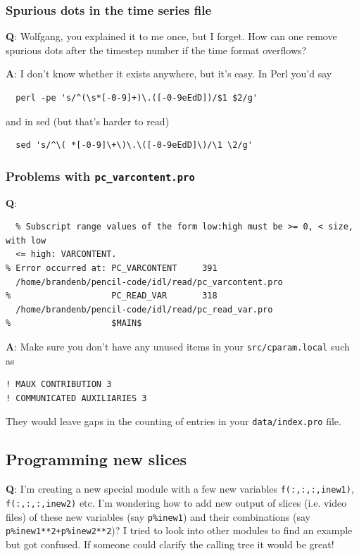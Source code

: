 \documentclass[\mydriver,12pt,twoside,notitlepage,a4paper]{article}
\newcommand{\code}[1]{\texttt{#1}}
\begin{document}
\subsubsection{Spurious dots in the time series file}

{\bf Q}:
Wolfgang, you explained it to me once, but I forget.
How can one remove spurious dots after the timestep number
if the time format overflows?

\medskip

{\bf A}:
I don't know whether it exists anywhere, but it's easy.
In Perl you'd say
\begin{Verbatim}
  perl -pe 's/^(\s*[-0-9]+)\.([-0-9eEdD])/$1 $2/g'
\end{Verbatim}
and in sed (but that's harder to read)
\begin{Verbatim}
  sed 's/^\( *[-0-9]\+\)\.\([-0-9eEdD]\)/\1 \2/g'
\end{Verbatim}


\subsubsection{Problems with \code{pc_varcontent.pro}}

{\bf Q}:

\begin{Verbatim}
  % Subscript range values of the form low:high must be >= 0, < size, with low
  <= high: VARCONTENT.
% Error occurred at: PC_VARCONTENT     391
  /home/brandenb/pencil-code/idl/read/pc_varcontent.pro
%                    PC_READ_VAR       318
  /home/brandenb/pencil-code/idl/read/pc_read_var.pro
%                    $MAIN$          
\end{Verbatim}

\medskip

{\bf A}:
Make sure you don't have any unused items in your
\code{src/cparam.local} such as
\begin{Verbatim}
! MAUX CONTRIBUTION 3
! COMMUNICATED AUXILIARIES 3
\end{Verbatim}
They would leave gaps in the counting of entries in your
\code{data/index.pro} file.


\subsection{Programming new slices}

{\bf Q}:
I'm creating a new special module with a few new variables \code{f(:,:,:,inew1)}, \code{f(:,:,:,inew2)} etc.
I'm wondering how to add new output of slices (i.e. video files)
of these new variables (say \code{p\%inew1}) and their combinations (say
\code{p\%inew1**2+p\%inew2**2})? I tried to look into other modules to find an
example but got confused. If someone could clarify the calling tree it
would be great!
\end{document}
